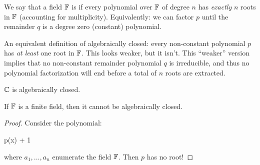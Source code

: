 \begin{definition}
  We say that a field $\mathbb{F}$ is  if every
  polynomial over $\mathbb{F}$ of degree $n$ has \emph{exactly} $n$ roots in
  $\mathbb{F}$ (accounting for multiplicity). Equivalently: we can factor
  $p$ until the remainder $q$ is a degree zero (constant) polynomial.

  An equivalent definition of algebraically closed: every non-constant
  polynomial $p$ has \emph{at least} one root in $\mathbb{F}$. This looks
  weaker, but it isn't. This ``weaker'' version implies that no
  non-constant remainder polynomial $q$ is irreducible, and thus no
  polynomial factorization will end before a total of $n$ roots are
  extracted.
\end{definition}

\begin{theorem}
  $\mathbb{C}$ is algebraically closed.
\end{theorem}

\begin{proposition}
  If $\mathbb{F}$ is a finite field, then it cannot be algebraically closed.
\end{proposition}

\begin{proof}
  Consider the polynomial:

  \begin{nedqn}
    p(x)
  \eqcol
    \cdots
    + 1
  \end{nedqn}

  \noindent
  where $a_1, \ldots, a_n$ enumerate the field $\mathbb{F}$. Then $p$ has no
  root!
\end{proof}

